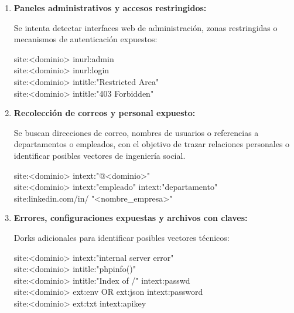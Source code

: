 \documentclass[a4paper, 11pt]{article}
\begin{document}
\begin{enumerate}
    \item \textbf{Paneles administrativos y accesos restringidos:}

   Se intenta detectar interfaces web de administración, zonas restringidas o mecanismos de autenticación expuestos:

    \begin{tcolorbox}[colback=yellow!20!white, colframe=orange!80!black, title={Dorks para paneles y logins}]
    \small
    site:<dominio> inurl:admin \\
    site:<dominio> inurl:login \\
    site:<dominio> intitle:"Restricted Area" \\
    site:<dominio> intitle:"403 Forbidden"
    \end{tcolorbox}

    \item \textbf{Recolección de correos y personal expuesto:}

    Se buscan direcciones de correo, nombres de usuarios o referencias a departamentos o empleados, con el objetivo de trazar relaciones personales o identificar posibles vectores de ingeniería social.

    \begin{tcolorbox}[colback=yellow!20!white, colframe=orange!80!black, title={Dorks para emails y personal}]
    \small
    site:<dominio> intext:"@<dominio>" \\
    site:<dominio> intext:"empleado" \textbar{} intext:"departamento" \\
    site:linkedin.com/in/ "\textless nombre\_empresa\textgreater"
    \end{tcolorbox}

    \item \textbf{Errores, configuraciones expuestas y archivos con claves:}

    Dorks adicionales para identificar posibles vectores técnicos:

     \begin{tcolorbox}[colback=yellow!20!white, colframe=orange!80!black, title={Dorks para claves, errores y archivos críticos}]
    \small
    site:<dominio> intext:"internal server error" \\
    site:<dominio> intitle:"phpinfo()" \\
    site:<dominio> intitle:"Index of /" intext:passwd \\
    site:<dominio> ext:env OR ext:json intext:password \\
    site:<dominio> ext:txt intext:apikey
    \end{tcolorbox}


\end{enumerate}
\end{document}
